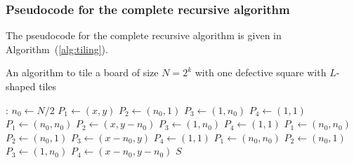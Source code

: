 \documentclass[12pt]{report}
\begin{document}
    \subsubsection*{Pseudocode for the complete recursive algorithm}
    The pseudocode for the complete recursive algorithm is given in Algorithm~(\ref{alg:tiling}).

    \begin{algorithm}
        \caption{An algorithm to tile a board of size $N = 2^{k}$ with one defective square with $L$-shaped tiles}
        \label{alg:tiling}
        \begin{algorithmic}[1]
            :
                    \State \Return {}
                \Else
                    \State $n_{0} \gets N/2$
                        \State $P_{1} \gets (x, y)$
                        \State $P_{2} \gets (n_{0}, 1)$
                        \State $P_{3} \gets (1, n_{0})$
                        \State $P_{4} \gets (1, 1)$
                        \State $P_{1} \gets (n_{0}, n_{0})$
                        \State $P_{2} \gets (x, y-n_{0})$
                        \State $P_{3} \gets (1, n_{0})$
                        \State $P_{4} \gets (1, 1)$
                        \State $P_{1} \gets (n_{0}, n_{0})$
                        \State $P_{2} \gets (n_{0}, 1)$
                        \State $P_{3} \gets (x-n_{0}, y)$
                        \State $P_{4} \gets (1, 1)$
                    \Else
                        \State $P_{1} \gets (n_{0}, n_{0})$
                        \State $P_{2} \gets (n_{0}, 1)$
                        \State $P_{3} \gets (1, n_{0})$
                        \State $P_{4} \gets (x-n_{0}, y-n_{0})$
                    \EndIf
                    \State {}
                    \State {}
                    \State {}
                    \State {}
                    \State {}
                    \State \Return $S$
                \EndIf
            \EndProcedure
        \end{algorithmic}
    \end{algorithm}
\end{document}
